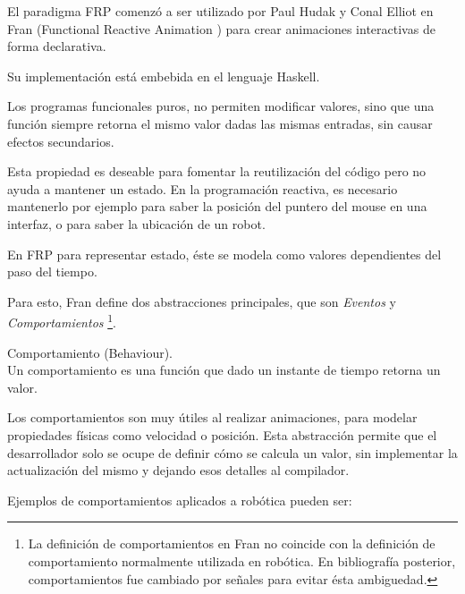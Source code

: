 

El paradigma FRP comenzó a ser utilizado por Paul Hudak y Conal Elliot en
Fran (Functional Reactive Animation \cite{ElliottHudak97:Fran})
para crear animaciones interactivas de forma declarativa.

Su implementación está embebida en el lenguaje Haskell.

Los programas funcionales puros, no permiten modificar valores,
sino que una función siempre retorna el mismo valor dadas las mismas
entradas, sin causar efectos secundarios.

Esta propiedad es deseable para fomentar la reutilización del código
pero no ayuda a mantener un estado.
En la programación reactiva, es necesario mantenerlo por
ejemplo para saber la posición del puntero del mouse en una interfaz,
o para saber la ubicación de un robot.

En FRP para representar estado, éste se modela como valores dependientes
del paso del tiempo.

Para esto, Fran define dos abstracciones principales,
que son \emph{Eventos} y \emph{Comportamientos}
\footnote{La definición de comportamientos en Fran no coincide con
la definición de comportamiento normalmente utilizada en robótica.
En bibliografía posterior, comportamientos fue cambiado por señales
para evitar ésta ambiguedad.}.

\begin{definicion}
  Comportamiento (Behaviour).\\

  Un comportamiento es una función que dado un instante de tiempo
  retorna un valor.


\end{definicion}

  Los comportamientos son muy útiles al realizar animaciones,
para modelar propiedades físicas como velocidad o posición.
  Esta abstracción permite que el desarrollador solo se ocupe de
definir cómo se calcula un valor, sin implementar la actualización
del mismo y dejando esos detalles al compilador.

  Ejemplos de comportamientos aplicados a robótica pueden ser:

